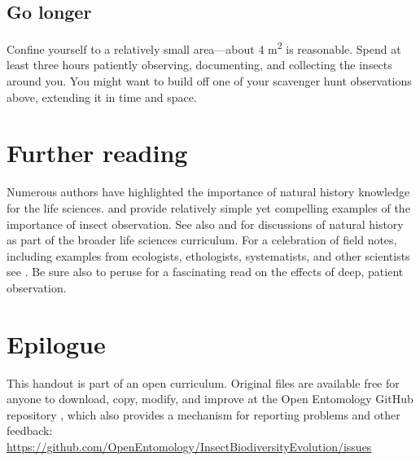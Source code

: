 \documentclass[letterpaper, 11pt]{article}
\begin{document}
\subsection*{Go longer}
Confine yourself to a relatively small area---about 4 m\textsuperscript{2} is reasonable. Spend at least three hours patiently observing, documenting, and collecting the insects around you. You might want to build off one of your scavenger hunt observations above, extending it in time and space.

\section*{Further reading}
Numerous authors have highlighted the importance of natural history knowledge for the life sciences. \cite{agrawal2014} and \cite{wilcoveeisner2000} provide relatively simple yet compelling examples of the importance of insect observation. See also \cite{Schmidly449} and \cite{Barrows13042016} for discussions of natural history as part of the broader life sciences curriculum. For a celebration of field notes, including examples from ecologists, ethologists, systematists, and other scientists see \cite{canfield2011field}. Be sure also to peruse \cite{roberts2013} for a fascinating read on the effects of deep, patient observation.

\clearpage

\section*{Epilogue}
This handout is part of an open curriculum. Original files are available free for anyone to download, copy, modify, and improve at the Open Entomology GitHub repository \citep{ENT432}, which also provides a mechanism for reporting problems and other feedback:\\
\url{https://github.com/OpenEntomology/InsectBiodiversityEvolution/issues}



\end{document}
